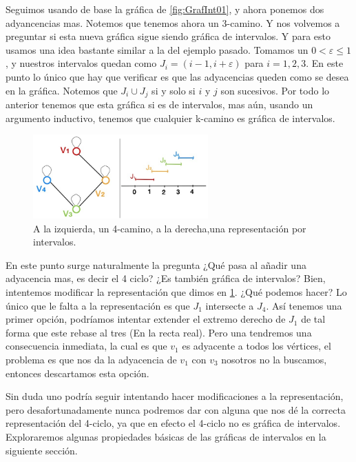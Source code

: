 Seguimos usando de base la gráfica de  \cref{fig:GrafInt01}, y ahora ponemos dos adyancencias mas. Notemos que tenemos ahora un 3-camino. 
Y nos volvemos a preguntar si esta nueva gráfica sigue siendo gráfica de intervalos. Y para esto usamos una idea bastante similar a la del ejemplo pasado. Tomamos un $0 < \varepsilon \leq 1$, y nuestros intervalos quedan como $J_i=(i-1, i+\varepsilon)$ para $i=1,2,3$.
En este punto lo único que hay que verificar es que las adyacencias queden como se desea en la gráfica. Notemos que $J_i \cup J_j $ si y solo si $i$ y $j$ son sucesivos. Por todo lo anterior tenemos que esta gráfica si es de intervalos, mas aún, usando un argumento inductivo, tenemos que cualquier k-camino es gráfica de intervalos.


\begin{figure}[H]
  \centering
  \includegraphics[width=0.6\textwidth]{recursos/capturas/203.jpg}
  \caption{A la izquierda, un 4-camino, a la derecha,una representación por intervalos.}
  \label{fig:GrafInt03}
\end{figure}

En este punto surge naturalmente la pregunta ¿Qué pasa al añadir una adyacencia mas, es decir el 4 ciclo? ¿Es también gráfica de intervalos?
Bien, intentemos modificar la representación que dimos en \cref{fig:GrafInt03}. ¿Qué podemos hacer? Lo único que le falta a la representación es que $J_1$ intersecte a $J_4$. Así tenemos una primer opción, podríamos intentar extender el extremo derecho de $J_1$ de tal forma que este rebase al tres (En la recta real). Pero una tendremos una consecuencia inmediata, la cual es que $v_1$ es adyacente a todos los vértices, el problema es que nos da la adyacencia de $v_1$ con $v_3$ nosotros no la buscamos, entonces descartamos esta opción.

Sin duda uno podría seguir intentando hacer modificaciones a la representación, pero desafortunadamente nunca podremos dar con alguna que nos dé la correcta representación del 4-ciclo, ya que en efecto el 4-ciclo no es gráfica de intervalos.   Exploraremos algunas propiedades b\'asicas de las gr\'aficas de intervalos en la siguiente secci\'on.

